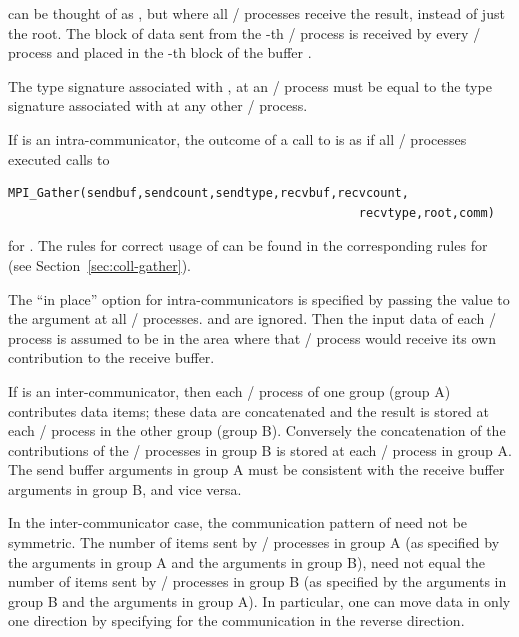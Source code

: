  can be thought of as , but
where all \MPI/ processes receive the result, instead of just the root.
The block of data sent from the
-th
\MPI/ process is received by every \MPI/ process and placed in the
-th
block of the buffer .

The type signature associated with ,
at an \MPI/ process must be equal to the type signature associated with
 at any other \MPI/ process.

If  is an intra-communicator,
the outcome of a call to  is as if
all \MPI/ processes executed  calls to
\begin{lstlisting}[language={[MPI]C}]
   MPI_Gather(sendbuf,sendcount,sendtype,recvbuf,recvcount,
                                                 recvtype,root,comm)
\end{lstlisting}
for .  The rules for correct usage of
 can be found in the corresponding rules
for  (see Section~\ref{sec:coll-gather}).

The ``in place'' option  for intra-communicators is specified by passing the
value
 to the argument  at all \MPI/ processes.
 and  are ignored.  Then the input data
of each \MPI/ process is assumed to be in the area where that
\MPI/ process would receive its own contribution to the receive
buffer.

If  is an inter-communicator, then each \MPI/ process
of one group (group A) contributes  data items; these
data are concatenated and the result
is stored at each \MPI/ process in the other
group (group B).  Conversely the concatenation of the
contributions of the \MPI/ processes in group B is stored at each \MPI/ process in
group A.   The send buffer arguments in group A must be consistent
with the receive buffer arguments in group B, and vice versa.

\begin{users}
In the inter-communicator case, the communication pattern of 
need not be symmetric.  The number of items
sent by \MPI/ processes in group A (as specified by the arguments
 in group A and the arguments
 in group B), need not equal the number of
items sent by \MPI/ processes in group B (as specified by the arguments
 in group B and the arguments
 in group A).  In particular, one can move
data in only one direction by specifying  for
the communication in the reverse direction.
\end{users}

